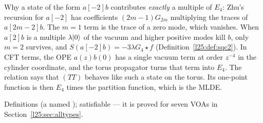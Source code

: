 \begin{physics}
Why a state of the form $a[-2]b$ contributes \emph{exactly} a multiple of $E_4$: Zhu's recursion for $a[-2]$ has
coefficients $(2m-1)G_{2m}$ multiplying the traces of $a[2m-2]b$. The $m=1$ term is the trace of a zero mode, which
vanishes. When $a[2]b$ is a multiple $\lambda|0\rangle$ of the vacuum and higher positive modes kill $b$, only
$m=2$ survives, and $S(a[-2]b)=-3\lambda G_4\star f$ (Definition~\ref{l25:def:sqc2}). In CFT terms, the OPE $a(z)b(0)$ has
a single vacuum term at order $z^{-4}$ in the cylinder coordinate, and the torus propagator turns that term into
$E_4$. The relation says that $(TT)$ behaves like such a state on the torus. Its one-point function is then $E_4$ times
the partition function, which is the MLDE.
\end{physics}
\begin{status}
Definitions (a named ); satisfiable --- it is proved for seven VOAs in
Section~\ref{l25:sec:alltypes}.
\end{status}


